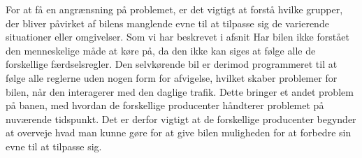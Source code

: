 For at få en angrænsning på problemet, er det vigtigt at forstå hvilke grupper, der bliver påvirket af bilens manglende evne til at tilpasse sig de varierende situationer eller omgivelser. Som vi har beskrevet i afsnit \label {interaktion} 
Har bilen ikke forstået den menneskelige måde at køre på, da den ikke kan siges at følge alle de forskellige færdselsregler. Den selvkørende bil er derimod programmeret til at følge alle reglerne uden nogen form for afvigelse, hvilket skaber problemer for bilen, når den interagerer med den daglige trafik. Dette bringer et andet problem på banen, med hvordan de forskellige producenter håndterer problemet på nuværende tidspunkt. Det er derfor vigtigt at de forskellige producenter begynder at overveje hvad man kunne gøre for at give bilen muligheden for at forbedre sin evne til at tilpasse sig. 

